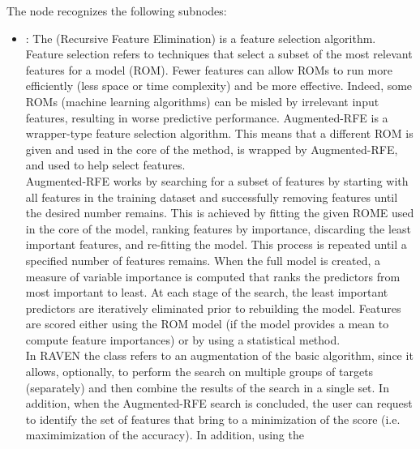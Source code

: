 \begin{itemize}
      The  node recognizes the following subnodes:
      \begin{itemize}
        \item {}:
          The  (Recursive Feature Elimination) is a feature selection
          algorithm.         Feature selection refers to techniques that select a subset of the most
          relevant features for a model (ROM).         Fewer features can allow ROMs to run more
          efficiently (less space or time complexity) and be more effective.         Indeed, some
          ROMs (machine learning algorithms) can be misled by irrelevant input features, resulting
          in worse         predictive performance.         Augmented-RFE is a wrapper-type feature
          selection algorithm. This means that a different ROM is given and used in the core of the
          method,         is wrapped by Augmented-RFE, and used to help select features.
          \\Augmented-RFE works by searching for a subset of features by starting with all features
          in the training dataset and successfully         removing         features until the
          desired number remains.         This is achieved by fitting the given ROME used in the
          core of the model, ranking features by importance,         discarding the least important
          features, and re-fitting the model. This process is repeated until a specified number of
          features remains.         When the full model is created, a measure of variable importance
          is computed that ranks the predictors from most         important to least.         At
          each stage of the search, the least important predictors are iteratively eliminated prior
          to rebuilding the model.         Features are scored either using the ROM model (if the
          model provides a mean to compute feature importances) or by         using a statistical
          method.         \\In RAVEN the  class refers to an augmentation
          of the basic algorithm, since it allows, optionally,         to perform the search on
          multiple groups of targets (separately) and then combine the results of the search in a
          single set. In addition, when the Augmented-RFE search is concluded, the user can request
          to identify the set of features         that bring to a minimization of the score (i.e.
          maximimization of the accuracy).         In addition, using the

\end{itemize}
\end{itemize}
